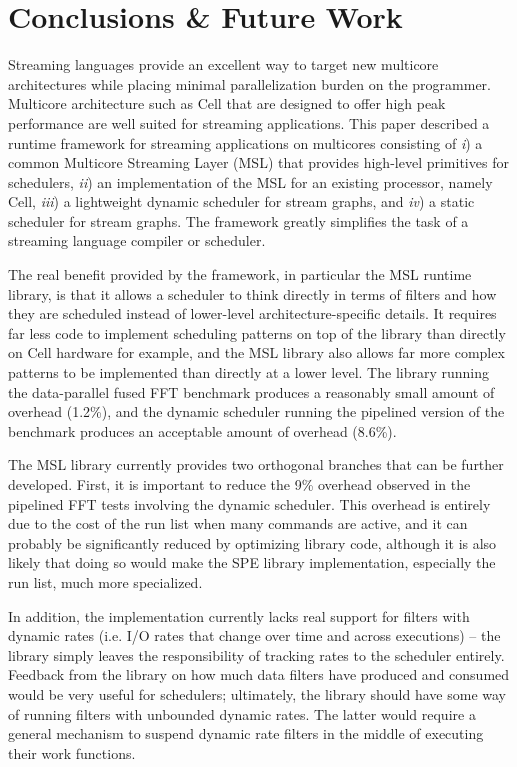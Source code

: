 \section{Conclusions \& Future Work}\label{ch:conc}

Streaming languages provide an excellent way to
target new multicore architectures while placing minimal
parallelization burden on the programmer. Multicore architecture such
as Cell that are designed to offer high peak performance are well
suited for streaming applications. This paper described a runtime
framework for streaming applications on multicores consisting of
\emph{i}) a common Multicore Streaming Layer (MSL) that provides
high-level primitives for schedulers, \emph{ii}) an implementation
of the MSL for an existing processor, namely Cell, \emph{iii}) a
lightweight dynamic scheduler for stream graphs, and \emph{iv}) a
static scheduler for stream graphs. The framework greatly
simplifies the task of a streaming language compiler or scheduler.

The real benefit provided by the framework, in particular the MSL
runtime library, is that it allows a scheduler to think directly in
terms of filters and how they are scheduled instead of lower-level
architecture-specific details. It requires far less code to implement
scheduling patterns on top of the library than directly on Cell
hardware for example, and the MSL library also allows far more complex
patterns to be implemented than directly at a lower level.
 The library running the data-parallel
fused FFT benchmark produces a reasonably small amount of overhead
(1.2\%), and the dynamic scheduler running the pipelined version of
the benchmark produces an acceptable amount of overhead (8.6\%).

The MSL library currently provides two orthogonal branches that can be
further developed. First, it is important to reduce the 9\% overhead
observed in the pipelined FFT tests involving the dynamic
scheduler. This overhead is entirely due to the cost of the run list
when many commands are active, and it can probably be significantly
reduced by optimizing library code, although it is also likely that
doing so would make the SPE library implementation, especially the run
list, much more specialized.

In addition, the implementation currently lacks real support for
filters with dynamic rates (i.e. I/O rates that change over time and
across executions)
-- the library simply leaves the
responsibility of tracking rates to the scheduler entirely. Feedback
from the library on how much data filters have produced and consumed
would be very useful for schedulers; ultimately, the library should
have some way of running filters with unbounded dynamic rates. The
latter would require a general mechanism to suspend dynamic rate
filters in the middle of executing their work functions.

